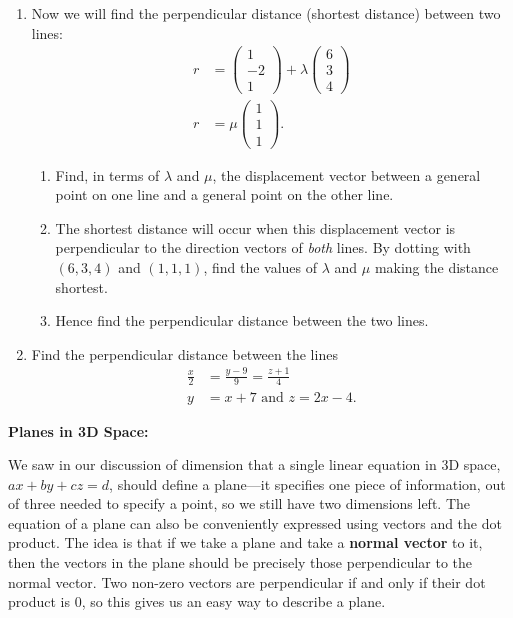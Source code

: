 \documentclass{article}
\begin{document}
\begin{enumerate}
	\item Now we will find the perpendicular distance (shortest distance) between two lines:
		\begin{align*}
			r&=\left(\begin{array}{c}1\\-2\\1\end{array}\right)+\lambda \left(\begin{array}{c}6\\3\\4\end{array}\right)\\
			r&= \mu\left(\begin{array}{c}1\\1\\1\end{array}\right).
		\end{align*}
		\begin{enumerate}
			\item Find, in terms of $\lambda$ and $\mu$, the displacement vector between a general point on one line and a general point on the other line.
			\item The shortest distance will occur when this displacement vector is perpendicular to the direction vectors of \textit{both} lines. By dotting with $(6,3,4)$ and $(1,1,1)$, find the values of $\lambda$ and $\mu$ making the distance shortest.
			\item Hence find the perpendicular distance between the two lines.
		\end{enumerate}
	\item Find the perpendicular distance between the lines
		\begin{align*}
			\frac{x}{2}&=\frac{y-9}{9}=\frac{z+1}{4}\\
			y&=x+7 \mbox{ and } z=2x-4.
		\end{align*}
\end{enumerate}


\clearpage




\textbf{Planes in 3D Space:}\bigskip


We saw in our discussion of dimension that a single linear equation in 3D space, $ax+by+cz=d$, should define a plane---it specifies one piece of information, out of three needed to specify a point, so we still have two dimensions left. The equation of a plane can also be conveniently expressed using vectors and the dot product. The idea is that if we take a plane and take a \textbf{normal vector} to it, then the vectors in the plane should be precisely those perpendicular to the normal vector. Two non-zero vectors are perpendicular if and only if their dot product is 0, so this gives us an easy way to describe a plane.
\end{document}
